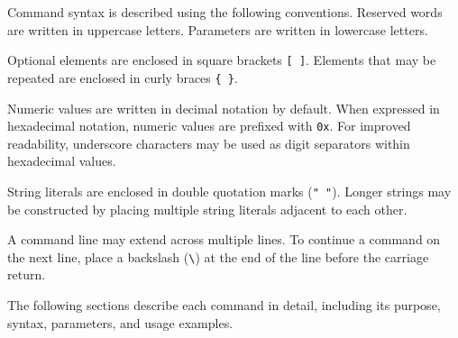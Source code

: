 
Command syntax is described using the following conventions. Reserved words
are written in uppercase letters. Parameters are written in lowercase letters.

Optional elements are enclosed in square brackets \texttt{[ ]}. Elements that
may be repeated are enclosed in curly braces \texttt{\{ \}}.

Numeric values are written in decimal notation by default. When expressed in
hexadecimal notation, numeric values are prefixed with \texttt{0x}. For improved
readability, underscore characters may be used as digit separators within
hexadecimal values.

String literals are enclosed in double quotation marks (\texttt{" "}). Longer
strings may be constructed by placing multiple string literals adjacent to
each other.

A command line may extend across multiple lines. To continue a command on the
next line, place a backslash (\texttt{\textbackslash}) at the end of the line
before the carriage return.

The following sections describe each command in detail, including its purpose,
syntax, parameters, and usage examples.























